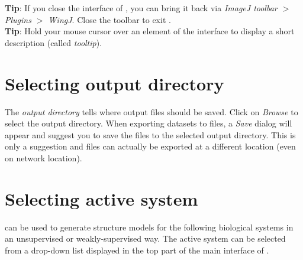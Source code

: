 \textbf{Tip}: If you close the interface of \wingj, you can bring it back via \textit{ImageJ toolbar $>$ Plugins $>$ WingJ}. Close the \ij toolbar to exit \wingj.\\

\textbf{Tip}: Hold your mouse cursor over an element of the interface to display a short description (called \emph{tooltip}).


% 

\section{Selecting output directory}
The \textit{output directory} tells \wingj where output files should be saved. Click on \textit{Browse} to select the output directory. When exporting datasets to files, a \textit{Save} dialog will appear and suggest you to save the files to the selected output directory. This is only a suggestion and files can actually be exported at a different location (even on network location).

\section{Selecting active system}\label{sec:biological_system}
\wingj can be used to generate structure models for the following biological systems in an unsupervised or weakly-supervised way. The active system can be selected from a drop-down list displayed in the top part of the main interface of \wingj.


